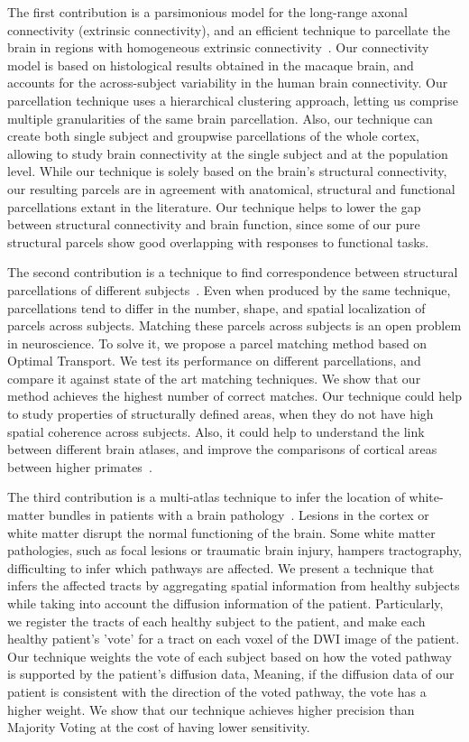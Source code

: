 The first contribution is a parsimonious model for the long-range axonal
connectivity (extrinsic connectivity), and an efficient technique to parcellate the
brain in regions with homogeneous extrinsic connectivity~\cite{Gallardo2017a}. Our
connectivity model is based on histological results obtained in the macaque
brain, and accounts for the across-subject variability in the human brain
connectivity. Our parcellation technique uses a hierarchical clustering approach,
letting us comprise multiple granularities of the same brain parcellation.
Also, our technique can create both single subject and groupwise parcellations
of the whole cortex, allowing to study brain connectivity at the single subject
and at the population level. While our technique is solely based on the brain's
structural connectivity, our resulting parcels are in agreement with anatomical,
structural and functional parcellations extant in the literature. Our technique
helps to lower the gap between structural connectivity and brain function, since
some of our pure structural parcels show good overlapping with responses to
functional tasks.

The second contribution is a technique to find correspondence between
structural parcellations of different subjects~\cite{Gallardo2018}. Even when
produced by the same technique, parcellations tend to differ in the
number, shape, and spatial localization of parcels across subjects. Matching
these parcels across subjects is an open problem in neuroscience. To solve
it, we propose a parcel matching method based on Optimal Transport. We test its
performance on different parcellations, and compare it against state of the
art matching techniques. We show that our method achieves the highest number
of correct matches. Our technique could help to study properties of structurally
defined areas, when they do not have high spatial coherence across subjects.
Also, it could help to understand the link between different brain atlases, and
improve the comparisons of cortical areas between higher primates~\cite{Mars2018}.

The third contribution is a multi-atlas technique to infer the location of 
white-matter bundles in patients with a brain pathology~\cite{Guillermo2018}.
Lesions in the cortex or white matter disrupt the normal functioning of the
brain. Some white matter pathologies, such as focal lesions or traumatic brain injury,
hampers tractography, difficulting to infer which pathways are affected. We 
present a technique that infers the affected tracts by aggregating spatial
information from healthy subjects while taking into account the diffusion
information of the patient. Particularly, we register the tracts of each
healthy subject to the patient, and make each healthy patient's 'vote' for a
tract on each voxel of the DWI image of the patient. Our technique weights the
vote of each subject based on how the voted pathway is supported by the patient's 
diffusion data, Meaning, if the diffusion data of our patient is consistent with
the direction of the voted pathway, the vote has a higher weight. We show that
our technique achieves higher precision than Majority Voting\cite{Xu1992} at
the cost of having lower sensitivity.


